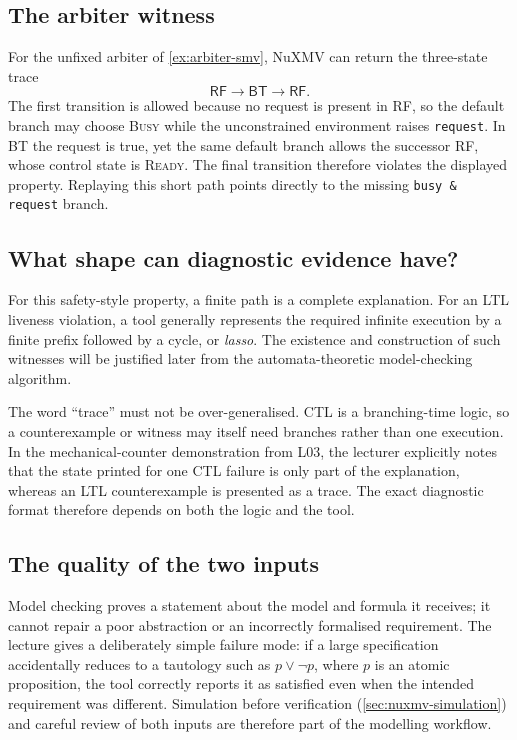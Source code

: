 \subsection{The arbiter witness}

\begin{example}
\label{ex:arbiter-safety-ce}
For the unfixed arbiter of \cref{ex:arbiter-smv}, NuXMV can return the
three-state trace
\[
  \textsf{RF}\to\textsf{BT}\to\textsf{RF}.
\]
The first transition is allowed because no request is present in
\textsf{RF}, so the default branch may choose \textsc{Busy} while the
unconstrained environment raises \texttt{request}.  In \textsf{BT} the
request is true, yet the same default branch allows the successor
\textsf{RF}, whose control state is \textsc{Ready}.  The final transition
therefore violates the displayed property.  Replaying this short path points
directly to the missing \texttt{busy \& request} branch.
\end{example}

\subsection{What shape can diagnostic evidence have?}

For this safety-style property, a finite path is a complete explanation.
For an LTL liveness violation, a tool generally represents the required
infinite execution by a finite prefix followed by a cycle, or \emph{lasso}.
The existence and construction of such witnesses will be justified later
from the automata-theoretic model-checking algorithm.

The word ``trace'' must not be over-generalised.  CTL is a branching-time
logic, so a counterexample or witness may itself need branches rather than
one execution.  In the mechanical-counter demonstration from L03, the
lecturer explicitly notes that the state printed for one CTL failure is only
part of the explanation, whereas an LTL counterexample is presented as a
trace.  The exact diagnostic format therefore depends on both the logic and
the tool.

\subsection{The quality of the two inputs}

Model checking proves a statement about the model and formula it receives;
it cannot repair a poor abstraction or an incorrectly formalised
requirement.  The lecture gives a deliberately simple failure mode: if a
large specification accidentally reduces to a tautology such as
$p\lor\neg p$, where $p$ is an atomic proposition, the tool correctly
reports it as satisfied even when the
intended requirement was different.  Simulation before verification
(\cref{sec:nuxmv-simulation}) and careful review of both inputs are therefore
part of the modelling workflow.

